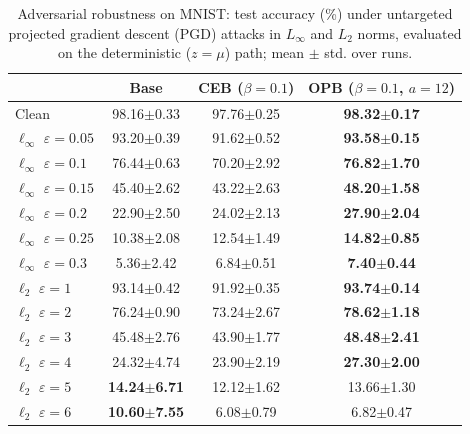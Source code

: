 \begin{table}[t]
\centering
\caption{Adversarial robustness on MNIST: test accuracy (\%) under untargeted projected gradient descent (PGD) attacks in $L_\infty$ and $L_2$ norms, evaluated on the deterministic ($z=\mu$) path; mean $\pm$ std. over runs.}
\label{tab:robustness}
\small
{
\setlength{\tabcolsep}{2pt}
\begin{tabular}{lccc}
\hline
 & Base & CEB ($\beta=0.1$) & OPB ($\beta=0.1$, $a=12$) \\
\hline
Clean & 98.16$\pm$0.33 & 97.76$\pm$0.25 & \textbf{98.32$\pm$0.17} \\
$\ell_\infty$ $\varepsilon=0.05$ & 93.20$\pm$0.39 & 91.62$\pm$0.52 & \textbf{93.58$\pm$0.15} \\
$\ell_\infty$ $\varepsilon=0.1$ & 76.44$\pm$0.63 & 70.20$\pm$2.92 & \textbf{76.82$\pm$1.70} \\
$\ell_\infty$ $\varepsilon=0.15$ & 45.40$\pm$2.62 & 43.22$\pm$2.63 & \textbf{48.20$\pm$1.58} \\
$\ell_\infty$ $\varepsilon=0.2$ & 22.90$\pm$2.50 & 24.02$\pm$2.13 & \textbf{27.90$\pm$2.04} \\
$\ell_\infty$ $\varepsilon=0.25$ & 10.38$\pm$2.08 & 12.54$\pm$1.49 & \textbf{14.82$\pm$0.85} \\
$\ell_\infty$ $\varepsilon=0.3$ & 5.36$\pm$2.42 & 6.84$\pm$0.51 & \textbf{7.40$\pm$0.44} \\
$\ell_2$ $\varepsilon=1$ & 93.14$\pm$0.42 & 91.92$\pm$0.35 & \textbf{93.74$\pm$0.14} \\
$\ell_2$ $\varepsilon=2$ & 76.24$\pm$0.90 & 73.24$\pm$2.67 & \textbf{78.62$\pm$1.18} \\
$\ell_2$ $\varepsilon=3$ & 45.48$\pm$2.76 & 43.90$\pm$1.77 & \textbf{48.48$\pm$2.41} \\
$\ell_2$ $\varepsilon=4$ & 24.32$\pm$4.74 & 23.90$\pm$2.19 & \textbf{27.30$\pm$2.00} \\
$\ell_2$ $\varepsilon=5$ & \textbf{14.24$\pm$6.71} & 12.12$\pm$1.62 & 13.66$\pm$1.30 \\
$\ell_2$ $\varepsilon=6$ & \textbf{10.60$\pm$7.55} & 6.08$\pm$0.79 & 6.82$\pm$0.47 \\
\hline
\end{tabular}
}
\end{table}
